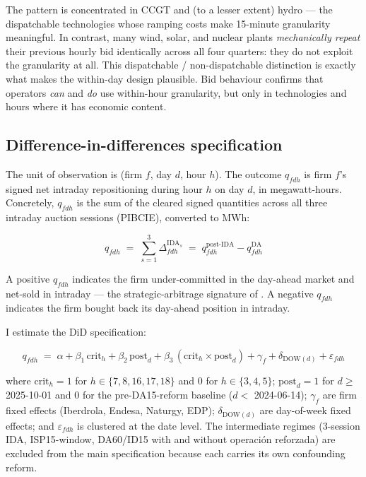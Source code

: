\documentclass[11pt,a4paper]{article}
\begin{document}
The pattern is concentrated in CCGT and (to a lesser extent) hydro --- the dispatchable technologies whose ramping costs make 15-minute granularity meaningful. In contrast, many wind, solar, and nuclear plants \emph{mechanically repeat} their previous hourly bid identically across all four quarters: they do not exploit the granularity at all. This dispatchable / non-dispatchable distinction is exactly what makes the within-day design plausible. Bid behaviour confirms that operators \emph{can} and \emph{do} use within-hour granularity, but only in technologies and hours where it has economic content.

\subsection{Difference-in-differences specification}

The unit of observation is (firm $f$, day $d$, hour $h$). The outcome $q_{fdh}$ is firm $f$'s signed net intraday repositioning during hour $h$ on day $d$, in megawatt-hours. Concretely, $q_{fdh}$ is the sum of the cleared signed quantities across all three intraday auction sessions (PIBCIE), converted to MWh:

\begin{equation*}
  q_{fdh} \;=\; \sum_{s=1}^{3} \Delta^{\text{IDA}_s}_{fdh}
        \;=\; q^{\text{post-IDA}}_{fdh} - q^{\text{DA}}_{fdh}
\end{equation*}

A positive $q_{fdh}$ indicates the firm under-committed in the day-ahead market and net-sold in intraday --- the strategic-arbitrage signature of \citet{ItoReguant2016}. A negative $q_{fdh}$ indicates the firm bought back its day-ahead position in intraday.

I estimate the DiD specification:

\begin{equation}
  q_{fdh} \;=\; \alpha + \beta_1\,\text{crit}_h + \beta_2\,\text{post}_d + \beta_3\,(\text{crit}_h \times \text{post}_d) + \gamma_f + \delta_{\text{DOW}(d)} + \varepsilon_{fdh}
  \label{eq:didspec}
\end{equation}

where $\text{crit}_h = 1$ for $h \in \{7,8,16,17,18\}$ and $0$ for $h \in \{3,4,5\}$; $\text{post}_d = 1$ for $d \geq$ 2025-10-01 and $0$ for the pre-DA15-reform baseline ($d <$ 2024-06-14); $\gamma_f$ are firm fixed effects (Iberdrola, Endesa, Naturgy, EDP); $\delta_{\text{DOW}(d)}$ are day-of-week fixed effects; and $\varepsilon_{fdh}$ is clustered at the date level. The intermediate regimes (3-session IDA, ISP15-window, DA60/ID15 with and without operación reforzada) are excluded from the main specification because each carries its own confounding reform.
\end{document}
